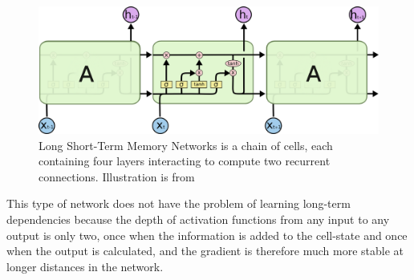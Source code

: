 \begin{figure}
	\centering
	\includegraphics[width=\textwidth]{sections/theory/LSTM3-chain.png}
	\caption{Long Short-Term Memory Networks is a chain of cells, each containing four layers 
		interacting to compute two recurrent connections. Illustration is from \cite{rnn}}
	\label{fig:lstm}
\end{figure}

This type of network does not have the problem of learning long-term dependencies because the depth  
of activation functions from any input to any output is only two, once when the information is 
added to the cell-state and once when the output is calculated, and the gradient is therefore 
much more stable at longer distances in the network. 


